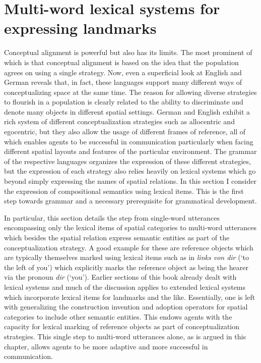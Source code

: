 % 

\chapter{Multi-word lexical systems for expressing landmarks}
\label{s:multi-word}
Conceptual alignment is powerful but also has its limits. The most prominent of which
is that conceptual alignment is based on the idea that the population agrees on using a 
single strategy. Now, even a superficial look at English and German reveals that, in fact, 
these languages support many different ways of conceptualizing space at the same time. 
The reason for allowing diverse strategies to flourish in a population is clearly related to 
the ability to discriminate and denote many objects in different spatial settings.
German and English exhibit a rich system of different conceptualization
strategies such as allocentric and egocentric, but they also allow the usage of different frames of reference,
all of which enables agents to be successful in communication particularly when facing different spatial layouts 
and features of the particular environment. The grammar of the respective languages organizes
the expression of these different strategies, but the expression of each strategy also relies heavily on 
lexical systems which go beyond simply expressing the names of spatial relations. 
In this section I consider the expression of compositional semantics using lexical items. 
This is the first step towards grammar and a necessary prerequisite for grammatical development. 

In particular, this section details the step from single-word utterances encompassing only the lexical 
items of spatial categories to multi-word utterances which besides the spatial relation express 
semantic entities as part of the conceptualization strategy. A good example for these are
reference objects which are typically themselves marked using lexical items such as 
in \textit{links von dir} (`to the left of you') which explicitly marks the reference object as being
the hearer via the pronoun \textit{dir} (`you'). Earlier sections of this book already 
dealt with lexical systems and much of the discussion applies to extended lexical systems which 
incorporate lexical items for landmarks and the like. Essentially, one is 
left with generalizing the construction invention and adoption operators for spatial 
categories to include other semantic entities. This endows agents with the capacity for lexical marking 
of reference objects as part of conceptualization strategies. This single step to\enlargethispage{1\baselineskip}
multi-word utterances alone, as is argued in this chapter, allows agents to be 
more adaptive and more successful in communication.

